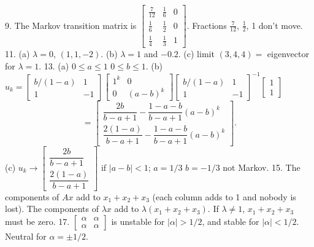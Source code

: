 9. The Markov transition matrix is \(\begin{bmatrix}\frac{7}{12}&\frac{1}{6}&0\\ \frac{1}{6}&\frac{1}{2}&0\\ \frac{1}{4}&\frac{1}{3}&1\end{bmatrix}\). Fractions \(\frac{7}{12}\), \(\frac{1}{2}\), 1 don't move.
11. (a) \(\lambda=0\), \((1,1,-2)\). (b) \(\lambda=1\) and \(-0.2\). (c) limit \((3,4,4)=\) eigenvector for \(\lambda=1\).
13. (a) \(0\leq a\leq 1\) \(0\leq b\leq 1\). (b) \(u_{k}=\begin{bmatrix}b/(1-a)&1\\ 1&-1\end{bmatrix}\begin{bmatrix}1^{k}&0\\ 0&(a-b)^{k}\end{bmatrix}\begin{bmatrix}b/(1-a)&1\\ 1&-1\end{bmatrix}^{-1}\begin{bmatrix}1\\ 1\end{bmatrix}\) \[=\begin{bmatrix}\dfrac{2b}{b-a+1}-\dfrac{1-a-b}{b-a+1}(a-b)^{k}\\ \dfrac{2(1-a)}{b-a+1}-\dfrac{1-a-b}{b-a+1}(a-b)^{k}\end{bmatrix}.\] (c) \(u_{k}\to\begin{bmatrix}\dfrac{2b}{b-a+1}\\ \dfrac{2(1-a)}{b-a+1}\end{bmatrix}\) if \(|a-b|<1\); \(a=1/3\) \(b=-1/3\) not Markov.
15. The components of \(Ax\) add to \(x_{1}+x_{2}+x_{3}\) (each column adds to 1 and nobody is lost). The components of \(\lambda x\) add to \(\lambda(x_{1}+x_{2}+x_{3})\). If \(\lambda\neq 1\), \(x_{1}+x_{2}+x_{3}\) must be zero.
17. \(\begin{bmatrix}\alpha&\alpha\\ \alpha&\alpha\end{bmatrix}\) is unstable for \(|\alpha|>1/2\), and stable for \(|\alpha|<1/2\). Neutral for \(\alpha=\pm 1/2\).

 